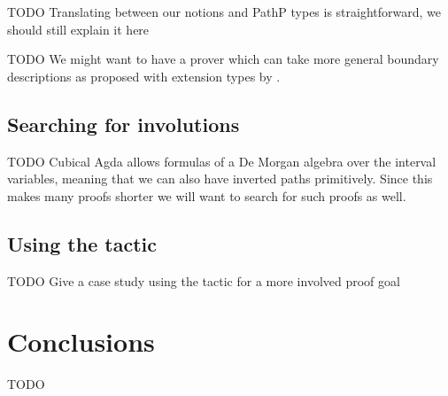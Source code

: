 \documentclass[11pt]{article}
\theoremstyle{definition}
\newcommand{\todo}[1]{
  \begin{tcolorbox}
    TODO {#1} 
  \end{tcolorbox}
}
\begin{document}
\todo{Translating between our notions and PathP types is straightforward, we
  should still explain it here}

\todo{We might want to have a prover which can take more general boundary
  descriptions as proposed with extension types by \cite{riehl17_type_theor_synth}.}

\subsection{Searching for involutions}
\label{ssec:inverses}

\todo{Cubical Agda allows formulas of a De Morgan algebra over the interval
  variables, meaning that we can also have inverted paths primitively. Since
  this makes many proofs shorter we will want to search for such proofs as well.}

\subsection{Using the tactic}

\todo{Give a case study using the tactic for a more involved proof goal}





\section{Conclusions}
\label{sec:conclusions}

\todo{}







\appendix


\end{document}
